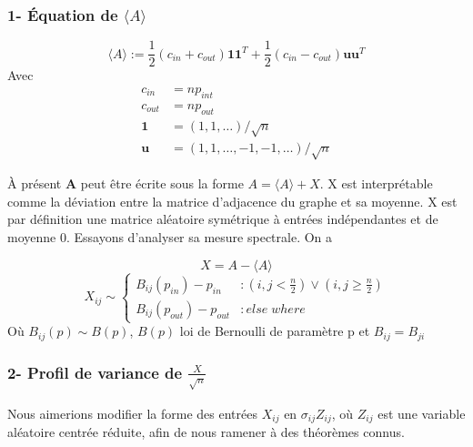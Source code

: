 \subsubsection*{1- Équation de $\langle A \rangle$}
\begin{equation} 
\langle A \rangle := \frac{1}{2}(c_{in} + c_{out})\mathbf{11}^T + \frac{1}{2}(c_{in} - c_{out})\mathbf{uu}^T \label{eq:1}
\end{equation}
Avec
\begin{align*}
c_{in} &= np_{int} \\
c_{out} &= np_{out}\\
\mathbf{1} &= (1, 1, \ldots)/\sqrt{n}\\
\mathbf{u} &= (1, 1, \ldots, -1, -1, \ldots)/\sqrt{n}
\end{align*}


À présent \textbf{A} peut être écrite sous la forme $A = \langle A \rangle + X$.
X est interprétable comme la déviation entre la matrice d'adjacence du graphe et sa moyenne.
X est par définition une matrice aléatoire symétrique à entrées indépendantes et de moyenne 0.
Essayons d'analyser sa mesure spectrale.
On a 

\begin{equation}
X = A - \langle A \rangle\nonumber
\end{equation}
\begin{equation}
	X_{ij} \sim \left\{
	\begin{array}{lr}
		B_{ij}(p_{in}) - p_{in} & : (i,j < \frac{n}{2}) \lor (i,j \ge \frac{n}{2}) \\
		B_{ij}(p_{out}) - p_{out} & : else \; where
	\end{array}
\right.\nonumber
\end{equation}
Où $B_{ij}(p) \sim B(p)$, $B(p)$ loi de Bernoulli de paramètre p et $B_{ij} = B_{ji}$\\


\subsubsection*{2- Profil de variance de $\frac{X}{\sqrt{n}}$}
Nous aimerions modifier la forme des entrées $X_{ij}$ en $\sigma_{ij} Z_{ij}$, où $Z_{ij}$ est une variable aléatoire centrée réduite, afin de nous ramener à des théorèmes connus.

